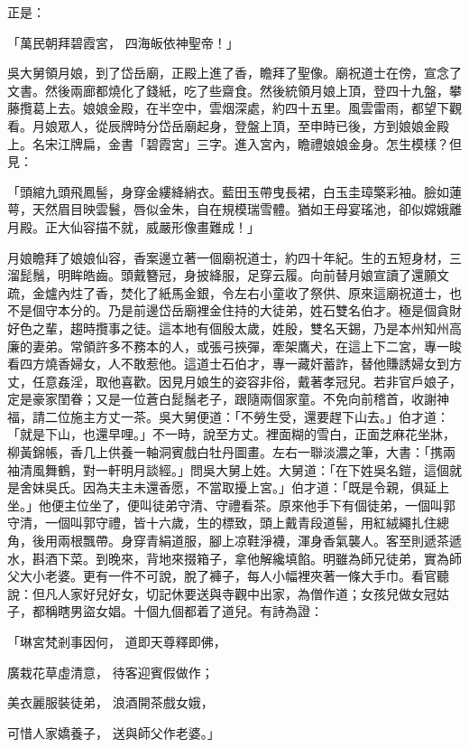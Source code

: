 \begin{showcontents}{}
正是：

「萬民朝拜碧霞宮，  四海皈依神聖帝！」

吳大舅領月娘，到了岱岳廟，正殿上進了香，瞻拜了聖像。廟祝道士在傍，宣念了文書。然後兩廊都燒化了錢紙，吃了些齋食。然後統領月娘上頂，登四十九盤，攀藤攬葛上去。娘娘金殿，在半空中，雲烟深處，約四十五里。風雲雷雨，都望下觀看。月娘眾人，從辰牌時分岱岳廟起身，登盤上頂，至申時已後，方到娘娘金殿上。名宋江牌扁，金書「碧霞宮」三字。進入宮內，瞻禮娘娘金身。怎生模樣？但見：

「頭綰九頭飛鳳髻，身穿金縷絳綃衣。藍田玉帶曳長裙，白玉圭璋檠彩袖。臉如蓮萼，天然眉目映雲鬟，唇似金朱，自在規模瑞雪體。猶如王母宴瑤池，卻似嫦娥離月殿。正大仙容描不就，威嚴形像畫難成！」

月娘瞻拜了娘娘仙容，香案邊立著一個廟祝道士，約四十年紀。生的五短身材，三溜髭鬚，明眸皓齒。頭戴簪冠，身披絳服，足穿云履。向前替月娘宣讀了還願文疏，金爐內炷了香，焚化了紙馬金銀，令左右小童收了祭供、原來這廟祝道士，也不是個守本分的。乃是前邊岱岳廟裡金住持的大徒弟，姓石雙名伯才。極是個貪財好色之輩，趨時攬事之徒。這本地有個殷太歲，姓殷，雙名天錫，乃是本州知州高廉的妻弟。常領許多不務本的人，或張弓挾彈，牽架鷹犬，在這上下二宮，專一睃看四方燒香婦女，人不敢惹他。這道士石伯才，專一藏奸蓄詐，替他賺誘婦女到方丈，任意姦淫，取他喜歡。因見月娘生的姿容非俗，戴著孝冠兒。若非官戶娘子，定是豪家閨眷；又是一位蒼白髭鬚老子，跟隨兩個家童。不免向前稽首，收謝神福，請二位施主方丈一茶。吳大舅便道：「不勞生受，還要趕下山去。」伯才道：「就是下山，也還早哩。」不一時，說至方丈。裡面糊的雪白，正面芝麻花坐牀，柳黃錦帳，香几上供養一軸洞賓戲白牡丹圖畫。左右一聯淡濃之筆，大書：「携兩袖清風舞鶴，對一軒明月談經。」問吳大舅上姓。大舅道：「在下姓吳名鎧，這個就是舍妹吳氏。因為夫主未還香愿，不當取擾上宮。」伯才道：「既是令親，俱延上坐。」他便主位坐了，便叫徒弟守清、守禮看茶。原來他手下有個徒弟，一個叫郭守清，一個叫郭守禮，皆十六歲，生的標致，頭上戴青段道髻，用紅絨繩扎住總角，後用兩根飄帶。身穿青絹道服，腳上凉鞋淨襪，渾身香氣襲人。客至則遞茶遞水，斟酒下菜。到晚來，背地來掇箱子，拿他解纔填餡。明雖為師兄徒弟，實為師父大小老婆。更有一件不可說，脫了褲子，每人小幅裡夾著一條大手巾。看官聽說：但凡人家好兒好女，切記休要送與寺觀中出家，為僧作道；女孩兒做女冠姑子，都稱瞎男盜女娼。十個九個都着了道兒。有詩為證：

「琳宮梵剎事因何，  道即天尊釋即佛，

廣栽花草虛清意，  待客迎賓假做作；

美衣麗服裝徒弟，  浪酒開茶戲女娥，

可惜人家嬌養子，  送與師父作老婆。」


\end{showcontents}
